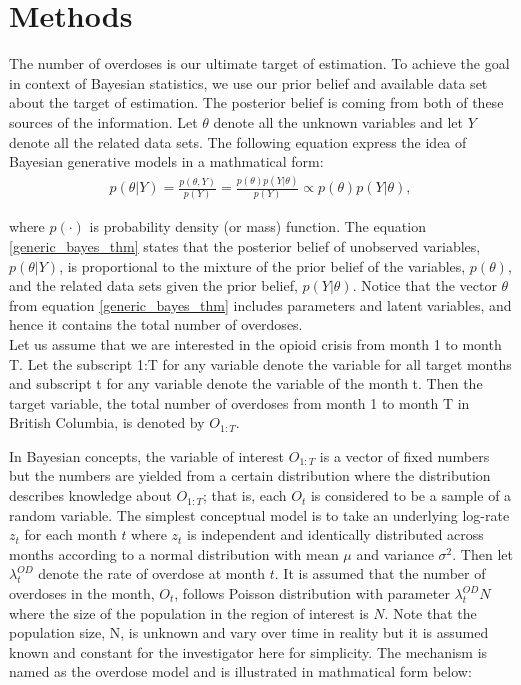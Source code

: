 \documentclass[12pt]{article}
\begin{document}
\section{Methods}

\normalsize 
The number of overdoses is our ultimate target of estimation. To achieve the goal in context of Bayesian statistics, we use our prior belief and available data set about the target of estimation. The posterior belief is coming from both of these sources of the information. Let $\theta$ denote all the unknown variables and let $Y$ denote all the related data sets. The following equation express the idea of Bayesian generative models in a mathmatical form:
\begin{equation}
\label{generic_bayes_thm}
\left.\begin{aligned}
p(\theta| Y ) = \frac{ p(\theta, Y)   }{ p(Y)} = \frac{ p(\theta) p(Y|\theta)}{ p(Y)} \propto p(\theta) p(Y| \theta), \end{aligned}\right.
\end{equation}

where $p(\cdot)$ is probability density (or mass) function. The equation \ref{generic_bayes_thm} states that the posterior belief of unobserved variables, $p(\theta|Y)$, is proportional to the mixture of the prior belief of the variables, $p(\theta)$, and the related data sets given the prior belief, $p(Y|\theta)$. Notice that the vector $\theta$ from equation \ref{generic_bayes_thm} includes parameters and latent variables, and hence it contains the total number of overdoses. \\

Let us assume that we are interested in the opioid crisis from month 1 to month T.  Let the subscript 1:T for any variable denote the variable for all target months and subscript t for any variable denote the variable of the month t. Then the target variable, the total number of overdoses from month 1 to month T  in British Columbia, is denoted by $O_{1:T}$.

In Bayesian concepts, the variable of interest $O_{1:T}$ is a vector of fixed numbers but the numbers are yielded from a certain distribution where the distribution describes knowledge about $O_{1:T}$; that is, each $O_t$ is considered to be a sample of a random variable. 
The simplest conceptual model is to take an underlying log-rate $z_t$ for each month $t$ where $z_t$ is independent and identically distributed across months according to a normal distribution with mean $\mu$ and variance $\sigma^2$. \cite{Irvine:modelling} Then let $\lambda_{t}^{OD}$ denote the rate of overdose at month $t$. It is assumed that the number of overdoses in the month, $O_t$, follows Poisson distribution with parameter $\lambda_{t}^{OD}N$ where the size of the population in the region of interest is $N$. Note that the population size, N, is unknown and vary over time in reality but it is assumed known and constant for the investigator here for simplicity. The mechanism is named as the overdose model  and is illustrated in mathmatical form below:
\end{document}
